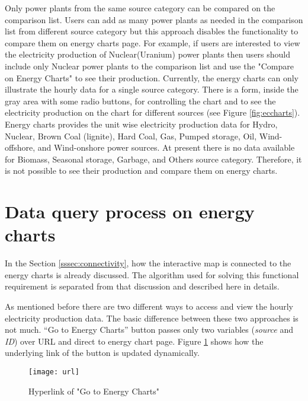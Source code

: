 Only power plants from the same source category can be compared on the comparison list. Users can add as many power plants as needed in the comparison list from different source category but this approach disables the functionality to compare them on energy charts page. For example, if users are interested to view the electricity production of Nuclear(Uranium) power plants then users should include only Nuclear power plants to the comparison list and use the "Compare on Energy Charts" to see their production. Currently, the energy charts can only illustrate the hourly data for a single source category. There is a form, inside the gray area with some radio buttons, for controlling the chart and to see the electricity production on the chart for different sources (see Figure \ref{fig:eccharts}). Energy charts provides the unit wise electricity production data for Hydro, Nuclear, Brown Coal (lignite), Hard Coal, Gas, Pumped storage, Oil, Wind-offshore, and Wind-onshore power sources. At present there is no data available for Biomass, Seasonal storage, Garbage, and Others source category. Therefore, it is not possible to see their production and compare them on energy charts.   

\section{Data query process on energy charts}
\label{sec:algorithm}

In the Section \ref{sssec:connectivity}, how the interactive map is connected to the energy charts is already discussed. The algorithm used for solving this functional requirement is separated from that discussion and described here in details. 

As mentioned before there are two different ways to access and view the hourly electricity production data. The basic difference between these two approaches is not much. “Go to Energy Charts” button passes only two variables (\textit{source} and \textit{ID}) over URL and direct to energy chart page. Figure \ref{fig:url} shows how the underlying link of the button is updated dynamically. 

\begin{figure}
\centering
\texttt{[image: url]}
\caption{Hyperlink of "Go to Energy Charts"}
\label{fig:url}
\end{figure}


